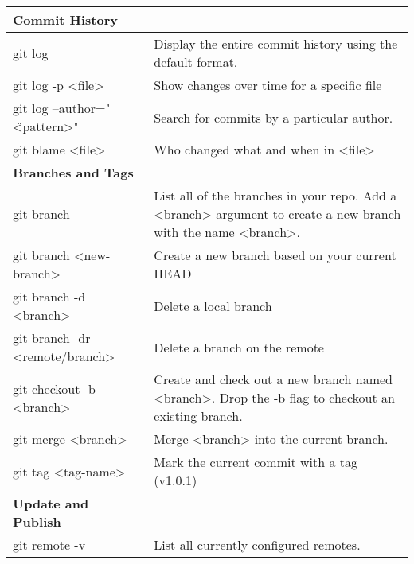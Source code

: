 \begin{longtable}{| p{} | p{} |}
    \textbf{Commit History}&  
    \\ \hline 

    \hline
    git log&
    Display the entire commit history using the default format.
    \\ \hline 
    
    git log -p <file>&
    Show changes over time for a specific file 
    \\ \hline
    
    git log --author="\"<pattern>"&
    Search for commits by a particular author. 
    \\ \hline
        
    git blame <file>& 
    Who changed what and when in <file>
    \\ \hline \hline

   \textbf{Branches and Tags}&  
    \\ \hline

    \hline
    git branch&
    List all of the branches in your repo. Add a <branch> argument to
    create a new branch with the name <branch>.
    \\ \hline 
    
    git branch <new-branch>&
    Create a new branch based
    on your current HEAD
    \\ \hline
    
    git branch -d <branch>&
    Delete a local branch
    \\ \hline   
    
    git branch -dr <remote/branch>&
    Delete a branch on the remote
    \\ \hline
        
    git checkout -b <branch>&
    Create and check out a new branch named <branch>. Drop the -b
    flag to checkout an existing branch.
    \\ \hline 
    
    git merge <branch>&
    Merge <branch> into the current branch.
    \\ \hline
    
    git tag <tag-name>&
    Mark the current commit with a tag (v1.0.1)
    \\ \hline  \hline
      
    \textbf{Update and Publish}&
    \\\hline 

    \hline
    git remote -v&
    List all currently configured remotes.
    \\ \hline 
    

\end{longtable}
